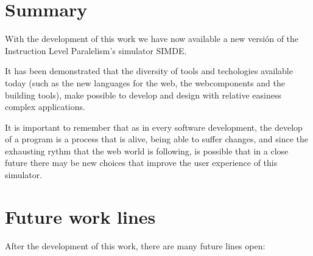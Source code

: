 
\section{Summary}
\label{8:sec:1}

With the development of this work we have now available a new versión of
the Instruction Level Paralelism's simulator SIMDE.

It has been demonstrated that the diversity of tools and techologies available today (such as 
the new languages for the web, the webcomponents and the building tools), make possible
to develop and design with relative easiness complex applications.

It is important to remember that as in every software development, the develop of 
a program is a process that is alive, being able to suffer changes, and since the 
exhausting rythm that the web world is following, is possible that in a close future
there may be new choices that improve the user experience of this simulator.

\section{Future work lines}
\label{8:sec:2}

After the development of this work, there are many future lines open: 

